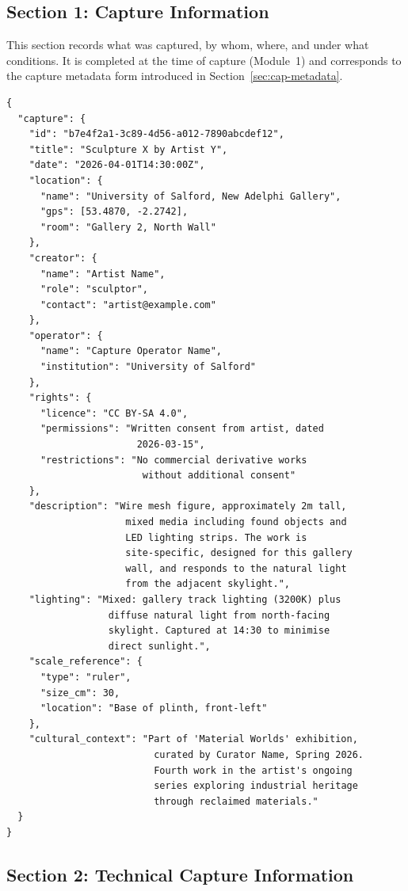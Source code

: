 \subsection{Section 1: Capture Information}

This section records what was captured, by whom, where, and under what conditions. It is completed at the time of capture (Module~1) and corresponds to the capture metadata form introduced in Section~\ref{sec:cap-metadata}.

\begin{lstlisting}[language={}, caption={Capture metadata section.}, label={lst:meta-capture}]
{
  "capture": {
    "id": "b7e4f2a1-3c89-4d56-a012-7890abcdef12",
    "title": "Sculpture X by Artist Y",
    "date": "2026-04-01T14:30:00Z",
    "location": {
      "name": "University of Salford, New Adelphi Gallery",
      "gps": [53.4870, -2.2742],
      "room": "Gallery 2, North Wall"
    },
    "creator": {
      "name": "Artist Name",
      "role": "sculptor",
      "contact": "artist@example.com"
    },
    "operator": {
      "name": "Capture Operator Name",
      "institution": "University of Salford"
    },
    "rights": {
      "licence": "CC BY-SA 4.0",
      "permissions": "Written consent from artist, dated
                       2026-03-15",
      "restrictions": "No commercial derivative works
                        without additional consent"
    },
    "description": "Wire mesh figure, approximately 2m tall,
                     mixed media including found objects and
                     LED lighting strips. The work is
                     site-specific, designed for this gallery
                     wall, and responds to the natural light
                     from the adjacent skylight.",
    "lighting": "Mixed: gallery track lighting (3200K) plus
                  diffuse natural light from north-facing
                  skylight. Captured at 14:30 to minimise
                  direct sunlight.",
    "scale_reference": {
      "type": "ruler",
      "size_cm": 30,
      "location": "Base of plinth, front-left"
    },
    "cultural_context": "Part of 'Material Worlds' exhibition,
                          curated by Curator Name, Spring 2026.
                          Fourth work in the artist's ongoing
                          series exploring industrial heritage
                          through reclaimed materials."
  }
}
\end{lstlisting}

\subsection{Section 2: Technical Capture Information}

